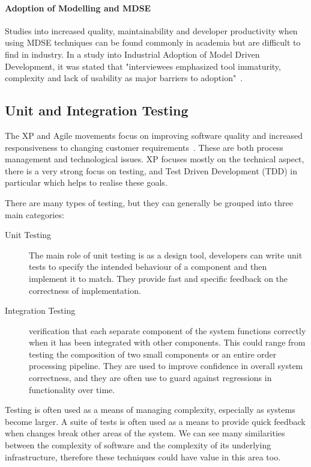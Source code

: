 \documentclass{cshonours}
\begin{document}
\paragraph{Adoption of Modelling and MDSE}

Studies into increased quality, maintainability and developer productivity when using MDSE techniques can be found commonly in academia but are difficult to find in industry. In a study into Industrial Adoption of Model Driven Development, it was stated that "interviewees emphasized tool immaturity, complexity and lack of usability as major barriers to adoption"~\cite{IndustryMDSE}.

\pagebreak
\subsection{Unit and Integration Testing}

The XP and Agile movements focus on improving software quality and increased responsiveness to changing customer requirements~\cite{WikiXP}. These are both process management and technological issues. XP focuses mostly on the technical aspect, there is a very strong focus on testing, and Test Driven Development (TDD) in particular which helps to realise these goals.

There are many types of testing, but they can generally be grouped into three main categories:

\begin{description}
  \item[Unit Testing] The main role of unit testing is as a design tool, developers can write unit tests to specify the intended behaviour of a component and then implement it to match. They provide fast and specific feedback on the correctness of implementation.
  \item[Integration Testing] verification that each separate component of the system functions correctly when it has been integrated with other components. This could range from testing the composition of two small components or an entire order processing pipeline. They are used to improve confidence in overall system correctness, and they are often use to guard against regressions in functionality over time.
\end{description}

Testing is often used as a means of managing complexity, especially as systems become larger. A suite of tests is often used as a means to provide quick feedback when changes break other areas of the system. We can see many similarities between the complexity of software and the complexity of its underlying infrastructure, therefore these techniques could have value in this area too.
\end{document}
